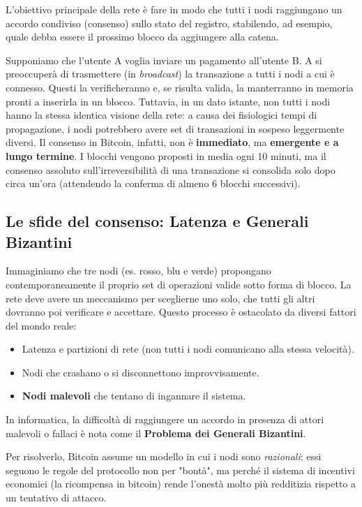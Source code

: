 L'obiettivo principale della rete è fare in modo che tutti i nodi raggiungano un accordo condiviso (consenso) sullo stato del registro, stabilendo, ad esempio, quale debba essere il prossimo blocco da aggiungere alla catena.

Supponiamo che l'utente A voglia inviare un pagamento all'utente B. A si preoccuperà di trasmettere (in \textit{broadcast}) la transazione a tutti i nodi a cui è connesso. Questi la verificheranno e, se risulta valida, la manterranno in memoria pronti a inserirla in un blocco. 
Tuttavia, in un dato istante, non tutti i nodi hanno la stessa identica visione della rete: a causa dei fisiologici tempi di propagazione, i nodi potrebbero avere set di transazioni in sospeso leggermente diversi. Il consenso in Bitcoin, infatti, non è \textbf{immediato}, ma \textbf{emergente e a lungo termine}. I blocchi vengono proposti in media ogni 10 minuti, ma il consenso assoluto sull'irreversibilità di una transazione si consolida solo dopo circa un'ora (attendendo la conferma di almeno 6 blocchi successivi).

\subsection*{Le sfide del consenso: Latenza e Generali Bizantini}
Immaginiamo che tre nodi (es. rosso, blu e verde) propongano contemporaneamente il proprio set di operazioni valide sotto forma di blocco. La rete deve avere un meccanismo per sceglierne uno solo, che tutti gli altri dovranno poi verificare e accettare. Questo processo è ostacolato da diversi fattori del mondo reale:
\begin{itemize}
    \item Latenza e partizioni di rete (non tutti i nodi comunicano alla stessa velocità).
    \item Nodi che crashano o si disconnettono improvvisamente.
    \item \textbf{Nodi malevoli} che tentano di ingannare il sistema.
\end{itemize}

In informatica, la difficoltà di raggiungere un accordo in presenza di attori malevoli o fallaci è nota come il \textbf{Problema dei Generali Bizantini}. 

Per risolverlo, Bitcoin assume un modello in cui i nodi sono \textit{razionali}: essi seguono le regole del protocollo non per "bontà", ma perché il sistema di incentivi economici (la ricompensa in bitcoin) rende l'onestà molto più redditizia rispetto a un tentativo di attacco.

